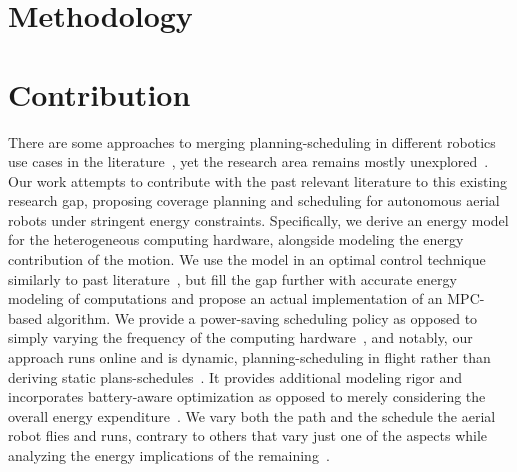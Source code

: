 \section{\color{red}Methodology}



\section{Contribution}
\label{sec:contribs}

There are some approaches to merging planning-scheduling in different robotics use cases in the literature~\citep{mei2005case,mei2006deployment,brateman2006energy,zhang2007low,sadrpour2013experimental,sadrpour2013mission,ondruska2015scheduled,lahijanian2018resource,sudhakar2020balancing}, yet the research area remains mostly unexplored~\citep{sudhakar2020balancing,brateman2006energy}. Our work attempts to contribute with the past relevant literature to this existing research gap, proposing coverage planning and scheduling for autonomous aerial robots under stringent energy constraints. Specifically, we derive an energy model for the heterogeneous computing hardware, alongside modeling the energy contribution of the motion. We use the model in an optimal control technique similarly to past literature~\citep{zhang2007low,ondruska2015scheduled,lahijanian2018resource,brateman2006energy}, but fill the gap further with accurate energy modeling of computations and propose an actual implementation of an MPC-based algorithm. We provide a power-saving scheduling policy as opposed to simply varying the frequency of the computing hardware~\citep{zhang2007low,brateman2006energy}, and notably, our approach runs online and is dynamic, planning-scheduling in flight rather than deriving static plans-schedules~\citep{lahijanian2018resource}. It provides additional modeling rigor and incorporates battery-aware optimization as opposed to merely considering the overall energy expenditure~\citep{sudhakar2020balancing}. We vary both the path and the schedule the aerial robot flies and runs, contrary to others that vary just one of the aspects while analyzing the energy implications of the remaining~\citep{ondruska2015scheduled}.

